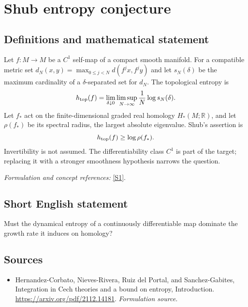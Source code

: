 \documentclass[11pt]{article}
\begin{document}
\section*{\texorpdfstring{Shub entropy conjecture}{Shub entropy conjecture}}\label{statement}
\subsection{Definitions and mathematical statement}
Let $f:M\to M$ be a $C^1$ self-map of a compact smooth manifold. For a compatible metric set $d_N(x,y)=\max_{0\le j<N}d(f^jx,f^jy)$ and let $s_N(\delta)$ be the maximum cardinality of a $\delta$-separated set for $d_N$. The topological entropy is
\[
 h_{\rm top}(f)=\lim_{\delta\downarrow0}\limsup_{N\to\infty}
 \frac1N\log s_N(\delta).
\]
Let $f_*$ act on the finite-dimensional graded real homology $H_*(M;{\mathbb{R}})$, and let $\rho(f_*)$ be its spectral radius, the largest absolute eigenvalue. Shub's assertion is
\[
 h_{\rm top}(f)\ge\log\rho(f_*).
\]
Invertibility is not assumed. The differentiability class $C^1$ is part of the target; replacing it with a stronger smoothness hypothesis narrows the question.
\par\smallskip\textit{Formulation and concept references:} \href{https://arxiv.org/pdf/2112.14181}{[S1]}.

\subsection{Short English statement}
Must the dynamical entropy of a continuously differentiable map dominate the growth rate it induces on homology?
\subsection{Sources}
\begin{itemize}
\item[S1]Hernandez-Corbato, Nieves-Rivera, Ruiz del Portal, and Sanchez-Gabites, Integration in Cech theories and a bound on entropy, Introduction.
\url{https://arxiv.org/pdf/2112.14181}.
\textit{Formulation source.}
\end{itemize}
\end{document}
